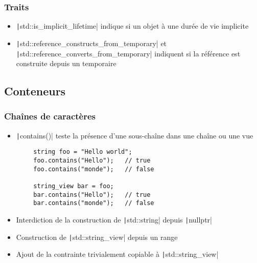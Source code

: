 \documentclass[C++.tex]{subfiles}
\begin{document}
\begin{frame}[fragile]
	\frametitle{Traits}
	\begin{itemize}
		\item \texttt|std::is_implicit_lifetime| indique si un objet à une durée de vie implicite
		\item \texttt|std::reference_constructs_from_temporary| et \texttt|std::reference_converts_from_temporary| indiquent si la référence est construite depuis un temporaire
	\end{itemize}
\end{frame}

\subsection*{Conteneurs}
\begin{frame}[fragile]
	\frametitle{Chaînes de caractères}
	\begin{itemize}
		\item \texttt|contains()| teste la présence d'une sous-chaîne dans une chaîne ou une vue
	\end{itemize}

	\begin{verbatim}
		string foo = "Hello world";
		foo.contains("Hello");   // true
		foo.contains("monde");   // false

		string_view bar = foo;
		bar.contains("Hello");   // true
		bar.contains("monde");   // false
	\end{verbatim}


	\begin{itemize}
		\item Interdiction de la construction de \texttt|std::string| depuis \texttt|nullptr|


		\item Construction de \texttt|std::string_view| depuis un range
		\item Ajout de la contrainte trivialement copiable à \texttt|std::string_view|
	\end{itemize}


\end{frame}
\end{document}
